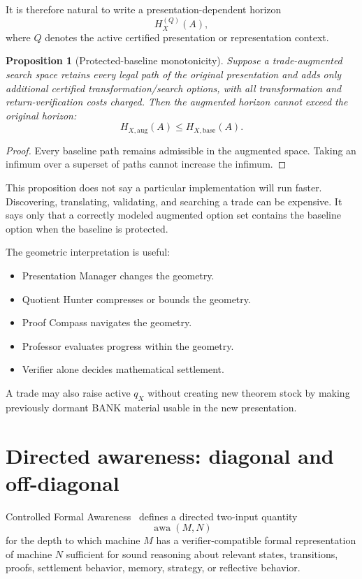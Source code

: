 \documentclass[11pt]{article}
\newtheorem{proposition}[theorem]{Proposition}
\theoremstyle{definition}
\theoremstyle{remark}
\newcommand{\awa}{\operatorname{awa}}
\begin{document}
It is therefore natural to write a presentation-dependent horizon
\[
H_X^{(Q)}(A),
\]
where $Q$ denotes the active certified presentation or representation context.

\begin{proposition}[Protected-baseline monotonicity]
Suppose a trade-augmented search space retains every legal path of the original presentation and adds only additional certified transformation/search options, with all transformation and return-verification costs charged. Then the augmented horizon cannot exceed the original horizon:
\[
\boxed{H_{X,\mathrm{aug}}(A)\le H_{X,\mathrm{base}}(A).}
\]
\end{proposition}

\begin{proof}
Every baseline path remains admissible in the augmented space. Taking an infimum over a superset of paths cannot increase the infimum.
\end{proof}

This proposition does not say a particular implementation will run faster. Discovering, translating, validating, and searching a trade can be expensive. It says only that a correctly modeled augmented option set contains the baseline option when the baseline is protected.

The geometric interpretation is useful:
\begin{itemize}
\item Presentation Manager changes the geometry.
\item Quotient Hunter compresses or bounds the geometry.
\item Proof Compass navigates the geometry.
\item Professor evaluates progress within the geometry.
\item Verifier alone decides mathematical settlement.
\end{itemize}

A trade may also raise active $q_X$ without creating new theorem stock by making previously dormant BANK material usable in the new presentation.

\section{Directed awareness: diagonal and off-diagonal}

Controlled Formal Awareness~\cite{awareness} defines a directed two-input quantity
\[
\boxed{\awa(M,N)}
\]
for the depth to which machine $M$ has a verifier-compatible formal representation of machine $N$ sufficient for sound reasoning about relevant states, transitions, proofs, settlement behavior, memory, strategy, or reflective behavior.
\end{document}
